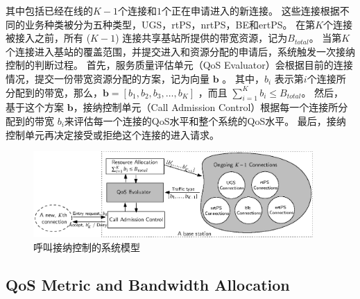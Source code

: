 其中包括已经在线的$K-1$个连接和$1$个正在申请进入的新连接。
这些连接根据不同的业务种类被分为五种类型，UGS，rtPS，nrtPS，BE和ertPS。
在第$K$个连接被接入之前，所有 ($K-1$) 连接共享基站所提供的带宽资源，记为$B_{total}$。
当第$K$个连接进入基站的覆盖范围，并提交进入和资源分配的申请后，系统触发一次接纳控制的判断过程。
首先，服务质量评估单元（QoS Evaluator）会根据目前的连接情况，提交一份带宽资源分配的方案，记为向量 $\mathbf{b}$ 。
其中，$b_i$ 表示第$i$个连接所分配到的带宽，那么，$\mathbf{b} = [ b_1, b_2, b_3, \dots, b_K]$ ，而且 $\sum_{i=1}^K b_i \le B_{total}$。
然后，
基于这个方案 $\mathbf{b}$，接纳控制单元（Call Admission Control）根据每一个连接所分配到的带宽 $b_i$来评估每一个连接的QoS水平和整个系统的QoS水平。
最后，接纳控制单元再决定接受或拒绝这个连接的进入请求。
\begin{figure}[t]
\centering
\includegraphics[width=0.95\textwidth]{cac_qos_model_system.eps}
\caption{ 呼叫接纳控制的系统模型} \label{fig_system_model_cac}
\end{figure}
\subsection{QoS Metric and Bandwidth Allocation}





























































